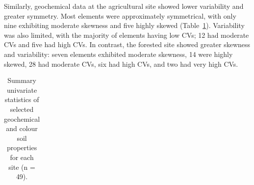 \documentclass[
  number]{elsarticle}
\begin{document}
Similarly, geochemical data at the agricultural site showed lower
variability and greater symmetry. Most elements were approximately
symmetrical, with only nine exhibiting moderate skewness and five highly
skewed (Table~\ref{tbl-univariate-summary}). Variability was also
limited, with the majority of elements having low CVs; 12 had moderate
CVs and five had high CVs. In contrast, the forested site showed greater
skewness and variability: seven elements exhibited moderate skewness, 14
were highly skewed, 28 had moderate CVs, six had high CVs, and two had
very high CVs.

\begin{longtable}[]{@{}ccccccc@{}}

\caption{\label{tbl-univariate-summary}Summary univariate statistics of
selected geochemical and colour soil properties for each site (n = 49).}

\tabularnewline


\end{longtable}
\end{document}
